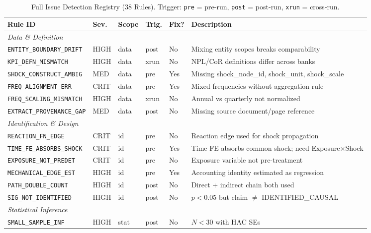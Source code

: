 \documentclass{article}
\begin{document}
\begin{table}[htbp]
\centering
\caption{Full Issue Detection Registry (38 Rules). Trigger: \texttt{pre} = pre-run, \texttt{post} = post-run, \texttt{xrun} = cross-run.}
\label{tab:issue-registry}
\scriptsize
\begin{tabular}{@{}lllllp{4.2cm}@{}}
\toprule
\textbf{Rule ID} & \textbf{Sev.} & \textbf{Scope} & \textbf{Trig.} & \textbf{Fix?} & \textbf{Description} \\
\midrule
\multicolumn{6}{l}{\textit{Data \& Definition}} \\
\texttt{ENTITY\_BOUNDARY\_DRIFT} & HIGH & data & post & No & Mixing entity scopes breaks comparability \\
\texttt{KPI\_DEFN\_MISMATCH} & HIGH & data & xrun & No & NPL/CoR definitions differ across banks \\
\texttt{SHOCK\_CONSTRUCT\_AMBIG} & MED & data & pre & Yes & Missing shock\_node\_id, shock\_unit, shock\_scale \\
\texttt{FREQ\_ALIGNMENT\_ERR} & CRIT & data & pre & Yes & Mixed frequencies without aggregation rule \\
\texttt{FREQ\_SCALING\_MISMATCH} & HIGH & data & xrun & No & Annual vs quarterly not normalized \\
\texttt{EXTRACT\_PROVENANCE\_GAP} & MED & data & post & No & Missing source document/page reference \\
\midrule
\multicolumn{6}{l}{\textit{Identification \& Design}} \\
\texttt{REACTION\_FN\_EDGE} & CRIT & id & pre & No & Reaction edge used for shock propagation \\
\texttt{TIME\_FE\_ABSORBS\_SHOCK} & CRIT & id & pre & Yes & Time FE absorbs common shock; need Exposure$\times$Shock \\
\texttt{EXPOSURE\_NOT\_PREDET} & CRIT & id & pre & No & Exposure variable not pre-treatment \\
\texttt{MECHANICAL\_EDGE\_EST} & HIGH & id & pre & Yes & Accounting identity estimated as regression \\
\texttt{PATH\_DOUBLE\_COUNT} & HIGH & id & post & No & Direct + indirect chain both used \\
\texttt{SIG\_NOT\_IDENTIFIED} & HIGH & id & post & No & $p<0.05$ but claim $\neq$ IDENTIFIED\_CAUSAL \\
\midrule
\multicolumn{6}{l}{\textit{Statistical Inference}} \\
\texttt{SMALL\_SAMPLE\_INF} & HIGH & stat & post & No & $N<30$ with HAC SEs \\

\end{tabular}
\end{table}
\end{document}
